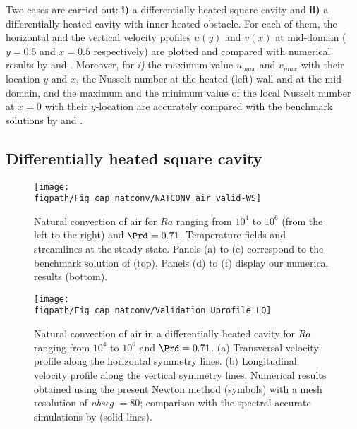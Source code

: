 Two cases are carried out: \textbf{ i)} a differentially heated square cavity and \textbf{ ii)} a differentially heated cavity with inner heated obstacle.
For each of them, the horizontal and the vertical velocity profiles $u(y)$ and $v(x)$ at mid-domain ($y=0.5$ and $x=0.5$ respectively) are plotted and compared with numerical results by \cite{LeQuere91} and \cite{Raluca2013}. 
Moreover, for \textit{ i)} the maximum value $u_{max}$ and $v_{max}$ with their location $y$ and $x$, the Nusselt number at the heated (left) wall and  at the mid-domain, and the maximum and the minimum value of the local Nusselt number at $x=0$ with their $y$-location are accurately compared with the benchmark solutions by \cite{de1983natural} and \cite{LeQuere91}.

\subsection{Differentially heated square cavity} \label{sub-diff-heated}

\begin{figure}
	\begin{center}
		\texttt{[image: \\figpath/Fig\_cap\_natconv/NATCONV\_air\_valid-WS]} 
	\end{center}
	\caption{Natural convection of air for $Ra$ ranging from $10^4$ to $10^6$ (from the left to the right) and $\Prd = 0.71$. Temperature fields and streamlines at the steady state. Panels (a) to (c) correspond to the benchmark solution of \cite{Wakashima-2004} (top). Panels (d) to (f) display our numerical results (bottom).}
	\label{fig-natconv-field}
\end{figure}


\begin{figure}
	\begin{center}
		\texttt{[image: \\figpath/Fig\_cap\_natconv/Validation\_Uprofile\_LQ]} 
	\end{center}
	\caption{Natural convection of air in a differentially heated cavity for $Ra$ ranging from $10^4$ to $10^6$ and $\Prd = 0.71$. (a) Transversal velocity profile along the  horizontal symmetry lines. (b) Longitudinal velocity profile along the vertical symmetry lines. Numerical results obtained using the present Newton method (symbols) with a mesh resolution of {\em nbseg} $=80$; comparison with the spectral-accurate simulations by \cite{LeQuere91} (solid lines).}
	\label{fig-T1-prof}
\end{figure}



